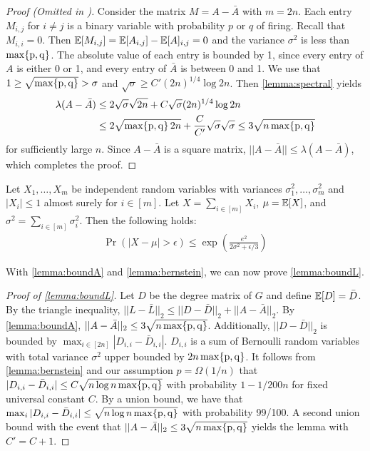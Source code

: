 \begin{proof}[Proof (Omitted in \cite{chitra20analyzing})]
    Consider the matrix $M=A- \bar{A}$ with $m=2n$.
    Each entry $M_{i,j}$ for $i\neq j$ is a binary variable with
    probability $p$ or $q$ of firing.
    Recall that $M_{i,i}=0$.
    Then $\operatorname*{\mathbb{E}}[M_{i,j}] = \operatorname*{\mathbb{E}}[A_{i,j}] - \operatorname*{\mathbb{E}}[A]_{i,j} = 0$ and
    the variance $\sigma^2$ is less than $\operatorname*{\max \{p, q\}}$.
    The absolute value of each entry is bounded by 1,
    since every entry of $A$ is either 0 or 1,
    and every entry of $\bar{A}$ is between 0 and 1.
    We use that $1 \geq \sqrt{\operatorname*{\max \{p, q\}}} > \sigma$ and
    $\sqrt{\sigma} \geq C' (2n)^{1/4} \log 2n$.
    Then \cref{lemma:spectral} yields
    \begin{align}
        \lambda(A - \bar{A}) &\leq 2 \sqrt{\sigma} \sqrt{2n} +
        C \sqrt{\sigma} (2n)^{1/4} \log 2n \nonumber \\
        &\leq 2 \sqrt{\operatorname*{\max \{p, q\}} 2n} + \frac{C}{C'}\sqrt{\sigma}\sqrt{\sigma}
        \leq 3 \sqrt{n \operatorname*{\max \{p, q\}}} \nonumber
    \end{align}
    for sufficiently large $n$.
    Since $A - \bar{A}$ is a square matrix,
    $||A-\bar{A}|| \leq \lambda(A-\bar{A})$, which completes the proof.
\end{proof}

\begin{lemma}\label{lemma:bernstein}
    Let $X_1, \ldots, X_m$ be independent random variables
    with variances $\sigma_1^2, \ldots, \sigma_m^2$ and
    $|X_i| \leq 1$ almost surely for $i \in [m]$.
    Let $X = \sum_{i \in [m]} X_i$, $\mu = \operatorname*{\mathbb{E}}[X]$,
    and $\sigma^2 = \sum_{i \in [m]} \sigma_i^2$.
    Then the following holds:
    \begin{align}
        \Pr (|X-\mu|>\epsilon) \leq \exp \left( \frac{e^2}
        {2\sigma^2 + \epsilon/3} \right) \nonumber
    \end{align}
\end{lemma}

With \cref{lemma:boundA} and \cref{lemma:bernstein},
we can now prove \cref{lemma:boundL}.


\begin{proof}[Proof of \cref{lemma:boundL}]
    Let $D$ be the degree matrix of $G$ and define
    $\operatorname*{\mathbb{E}}[D] = \bar{D}$. By the triangle inequality,
    $||L - \bar{L}||_2 \leq ||D - \bar{D}||_2 +
    ||A - \bar{A}||_2$.
    By \cref{lemma:boundA}, $||A - \bar{A}||_2 \leq
    3 \sqrt{n \operatorname*{\max \{p, q\}}}$.
    Additionally, $||D - \bar{D}||_2$ is bounded
    by $\max_{i \in [2n]} |D_{i,i} - \bar{D}_{i,i}|$.
    $D_{i,i}$ is a sum of Bernoulli random variables
    with total variance $\sigma^2$ upper bounded by
    $2 n \operatorname*{\max \{p, q\}}$. It follows from \cref{lemma:bernstein}
    and our assumption $p = \Omega(1/n)$ that
    $|D_{i,i} - \bar{D}_{i,i}| \leq C \sqrt{n \log n \operatorname*{\max \{p, q\}}}$
    with probability $1- 1/200n$ for
    fixed universal constant $C$.
    By a union bound, we have that
    $\max_i | D_{i,i} - \bar{D}_{i,i}| \leq \sqrt{n \log n \operatorname*{\max \{p, q\}}}$
    with probability 99/100.
    A second union bound with the event that
    $||A - \bar{A}||_2 \leq 3 \sqrt{n \operatorname*{\max \{p, q\}}}$ yields the lemma with
    $C' = C+1$.
\end{proof}

